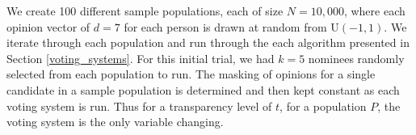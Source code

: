 
We create 100 different sample populations, each of size $N = 10,000$, where each opinion vector of $d=7$ for each person is drawn at random from U$(-1,1)$.
We iterate through each population and run through the each algorithm presented in Section \ref{voting_systems}.
For this initial trial, we had $k=5$ nominees randomly selected from each population to run.
The masking of opinions for a single candidate in a sample population is determined and then kept constant as each voting system is run.
Thus for a transparency level of $t$, for a population $P$, the voting system is the only variable changing.
